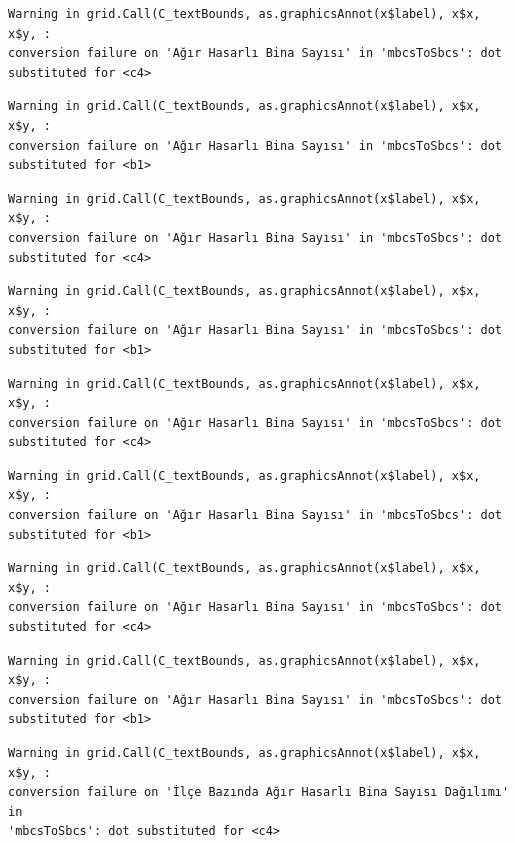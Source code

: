 \documentclass[
  11pt,
  a4paper,
  DIV=11,
  numbers=noendperiod]{scrartcl}
\begin{document}
\begin{verbatim}
Warning in grid.Call(C_textBounds, as.graphicsAnnot(x$label), x$x, x$y, :
conversion failure on 'Ağır Hasarlı Bina Sayısı' in 'mbcsToSbcs': dot
substituted for <c4>
\end{verbatim}

\begin{verbatim}
Warning in grid.Call(C_textBounds, as.graphicsAnnot(x$label), x$x, x$y, :
conversion failure on 'Ağır Hasarlı Bina Sayısı' in 'mbcsToSbcs': dot
substituted for <b1>
\end{verbatim}

\begin{verbatim}
Warning in grid.Call(C_textBounds, as.graphicsAnnot(x$label), x$x, x$y, :
conversion failure on 'Ağır Hasarlı Bina Sayısı' in 'mbcsToSbcs': dot
substituted for <c4>
\end{verbatim}

\begin{verbatim}
Warning in grid.Call(C_textBounds, as.graphicsAnnot(x$label), x$x, x$y, :
conversion failure on 'Ağır Hasarlı Bina Sayısı' in 'mbcsToSbcs': dot
substituted for <b1>
\end{verbatim}

\begin{verbatim}
Warning in grid.Call(C_textBounds, as.graphicsAnnot(x$label), x$x, x$y, :
conversion failure on 'Ağır Hasarlı Bina Sayısı' in 'mbcsToSbcs': dot
substituted for <c4>
\end{verbatim}

\begin{verbatim}
Warning in grid.Call(C_textBounds, as.graphicsAnnot(x$label), x$x, x$y, :
conversion failure on 'Ağır Hasarlı Bina Sayısı' in 'mbcsToSbcs': dot
substituted for <b1>
\end{verbatim}

\begin{verbatim}
Warning in grid.Call(C_textBounds, as.graphicsAnnot(x$label), x$x, x$y, :
conversion failure on 'Ağır Hasarlı Bina Sayısı' in 'mbcsToSbcs': dot
substituted for <c4>
\end{verbatim}

\begin{verbatim}
Warning in grid.Call(C_textBounds, as.graphicsAnnot(x$label), x$x, x$y, :
conversion failure on 'Ağır Hasarlı Bina Sayısı' in 'mbcsToSbcs': dot
substituted for <b1>
\end{verbatim}

\begin{verbatim}
Warning in grid.Call(C_textBounds, as.graphicsAnnot(x$label), x$x, x$y, :
conversion failure on 'İlçe Bazında Ağır Hasarlı Bina Sayısı Dağılımı' in
'mbcsToSbcs': dot substituted for <c4>
\end{verbatim}
\end{document}
